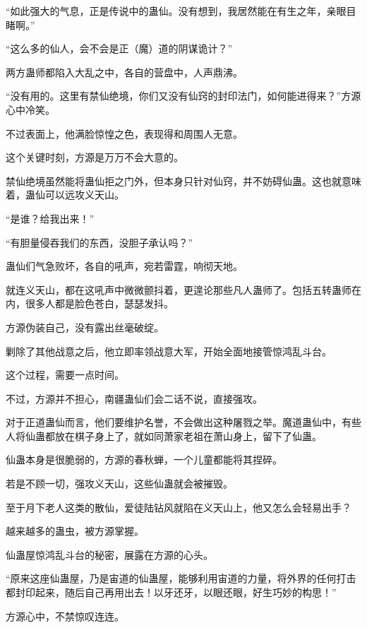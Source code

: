 \begin{this_body}
“如此强大的气息，正是传说中的蛊仙。没有想到，我居然能在有生之年，亲眼目睹啊。”

“这么多的仙人，会不会是正（魔）道的阴谋诡计？”

两方蛊师都陷入大乱之中，各自的营盘中，人声鼎沸。

“没有用的。这里有禁仙绝境，你们又没有仙窍的封印法门，如何能进得来？”方源心中冷笑。

不过表面上，他满脸惊惶之色，表现得和周围人无意。

这个关键时刻，方源是万万不会大意的。

禁仙绝境虽然能将蛊仙拒之门外，但本身只针对仙窍，并不妨碍仙蛊。这也就意味着，蛊仙可以远攻义天山。

“是谁？给我出来！”

“有胆量侵吞我们的东西，没胆子承认吗？”

蛊仙们气急败坏，各自的吼声，宛若雷霆，响彻天地。

就连义天山，都在这吼声中微微颤抖着，更遑论那些凡人蛊师了。包括五转蛊师在内，很多人都是脸色苍白，瑟瑟发抖。

方源伪装自己，没有露出丝毫破绽。

剿除了其他战意之后，他立即率领战意大军，开始全面地接管惊鸿乱斗台。

这个过程，需要一点时间。

不过，方源并不担心，南疆蛊仙们会二话不说，直接强攻。

对于正道蛊仙而言，他们要维护名誉，不会做出这种屠戮之举。魔道蛊仙中，有些人将仙蛊都放在棋子身上了，就如同萧家老祖在萧山身上，留下了仙蛊。

仙蛊本身是很脆弱的，方源的春秋蝉，一个儿童都能将其捏碎。

若是不顾一切，强攻义天山，这些仙蛊就会被摧毁。

至于月下老人这类的散仙，爱徒陆钻风就陷在义天山上，他又怎么会轻易出手？

越来越多的蛊虫，被方源掌握。

仙蛊屋惊鸿乱斗台的秘密，展露在方源的心头。

“原来这座仙蛊屋，乃是宙道的仙蛊屋，能够利用宙道的力量，将外界的任何打击都封印起来，随后自己再用出去！以牙还牙，以眼还眼，好生巧妙的构思！”

方源心中，不禁惊叹连连。

\end{this_body}

